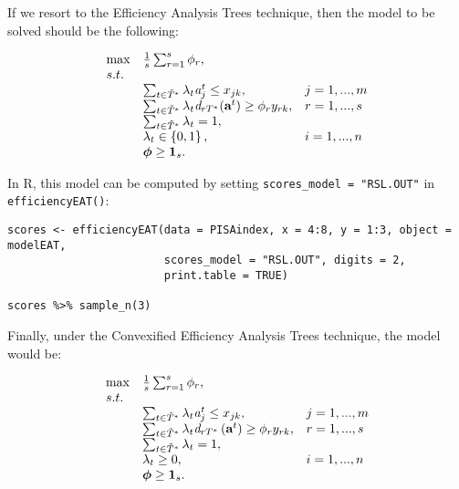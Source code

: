 If we resort to the Efficiency Analysis Trees technique, then the model to be solved should be the following:

\begin{equation} \label{(21)} 
\begin{array}{lllll} 
{} & {\max } & {\frac{1}{s} \sum_{r=1}^{s}\phi_{r},} & {} & {} \\ 
{} & {s.t.} & {} & {} & {} \\ 
{} & {} & {\sum_{t\in \tilde{T}^{*}}\lambda_{t} {\it a}_{j}^{t} \le x_{jk} ,} & {j=1,...,m} & {} \\ 
{} & {} & {\sum_{t\in \tilde{T}^{*}}\lambda_{t} {\it d}_{rT^{*}} ({\it \textbf{a}}^{t}) \ge \phi_{r} y_{rk} ,} & {r=1,...,s} & {} \\ 
{} & {} & {\sum_{t\in \tilde{T}^{*} }^{}\lambda_{t}=1,} & {} & {} \\ 
{} & {} & {\lambda_{t} \in \left\{0,1\right\},} & {i=1,...,n} & {} \\ 
{} & {} & {{\it \boldsymbol{\phi}}\ge {\bf 1}_{s}.} 
\end{array}
\end{equation}

In R, this model can be computed by setting \texttt{scores\_model\ =\ "RSL.OUT"} in \texttt{efficiencyEAT()}:

\begin{verbatim}
scores <- efficiencyEAT(data = PISAindex, x = 4:8, y = 1:3, object = modelEAT, 
                        scores_model = "RSL.OUT", digits = 2,
                        print.table = TRUE)

scores %>% sample_n(3)
\end{verbatim}

Finally, under the Convexified Efficiency Analysis Trees technique, the model would be:

\begin{equation} \label{(22)} 
\begin{array}{lllll} 
{} & {\max } & {\frac{1}{s} \sum_{r=1}^{s}\phi_{r},  } & {} & {} \\ 
{} & {s.t.} & {} & {} & {} \\ 
{} & {} & {\sum_{t\in \tilde{T}^{*} }^{}\lambda_{t} {\it a}_{j}^{t}  \le x_{jk} ,} & {j=1,...,m} & {} \\ 
{} & {} & {\sum_{t\in \tilde{T}^{*} }^{}\lambda_{t} {\it d}_{rT^{*}} \left({\it \textbf{a}}^{t} \right) \ge \phi_{r} y_{rk} ,} & {r=1,...,s} & {} \\ 
{} & {} & {\sum_{t\in \tilde{T}^{*} }^{}\lambda_{t}  =1,} & {} & {} \\ 
{} & {} & {\lambda_{t} \ge 0,} & {i=1,...,n} & {} \\ 
{} & {} & {{\it \boldsymbol{\phi}}\ge {\bf 1}_{s}.} 
\end{array}
\end{equation}

